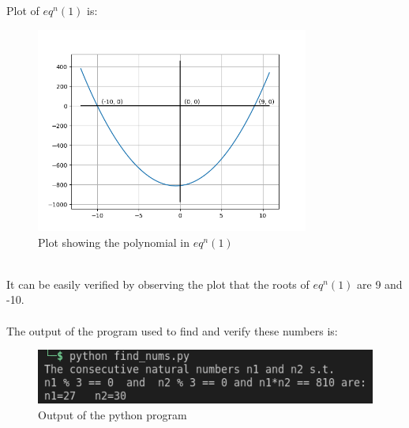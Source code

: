 \documentclass[11pt, a4paper]{article}
\begin{document}
    Plot of $eq^n(1)$ is:\\
    \begin{figure}[h]
        \centering
        \includegraphics[width=0.8\textwidth]{plot.png}
        \caption{Plot showing the polynomial in $eq^n(1)$}
    \end{figure}\\
    It can be easily verified by observing the plot that the roots of $eq^n (1)$ are 9 and -10.\\\\

    The output of the program used to find and verify these numbers is:
    \begin{figure}[h]
        \includegraphics[width=\textwidth]{output.png}
        \caption{Output of the python program}
    \end{figure}
\end{document}
